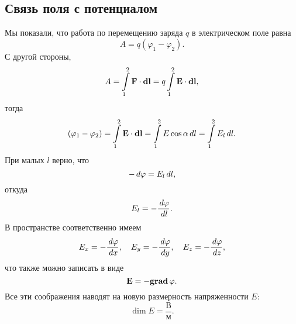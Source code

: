 	\subsection{Связь поля с потенциалом} 	

		Мы показали, что работа  по перемещению заряда $q$ в электрическом поле равна
			$$A=q\left(\varphi_1-\varphi_2\right).$$
		С другой стороны,
			$$A=\int\limits_1^2\text{\textbf{F}}\cdot\textbf{d}\text{\textbf{l}}=q\int\limits_1^2\text{\textbf{E}}\cdot\textbf{d}\text{\textbf{l}},$$
		тогда
			$$\left(\varphi_1-\varphi_2\right)=\int\limits_1^2\text{\textbf{E}}\cdot\textbf{d}\text{\textbf{l}}=\int\limits_1^2 E\cos{\alpha}\,d l=\int\limits_1^2 E_l\,d l.$$
		При малых $l$ верно, что
			$$-\,d \varphi=E_l\,d l,$$
		откуда
		\begin{equation}\label{phiderivative}
			E_l=-\frac{\,d \varphi}{\,d l}.
		\end{equation}
		В пространстве соответственно имеем
			$$E_x=-\frac{\,d \varphi}{\,d x}, \quad E_y=-\frac{\,d \varphi}{\,d y}, \quad E_z=-\frac{\,d \varphi}{\,d z},$$
		что также можно записать в виде 
			$$\text{\textbf{E}}=-\textbf{grad}\,\varphi.$$
		Все эти соображения наводят на новую размерность  напряженности $E$:
			$$\dim{E}=\frac{\text{В}}{\text{м}}.$$

